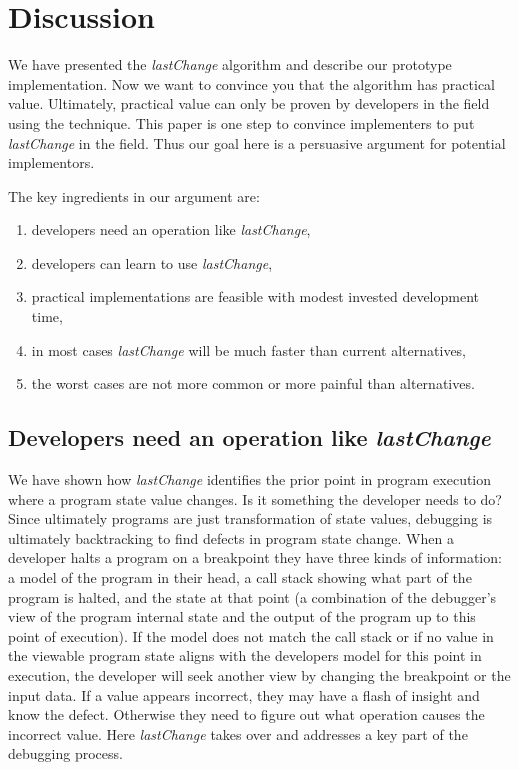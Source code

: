 \documentclass[preprint]{sigplanconf}
\begin{document}

\section{Discussion}

We have presented the \textit{lastChange} algorithm and describe our
prototype implementation. Now we want to convince you that the
algorithm has practical value. Ultimately, practical value can only be
proven by developers in the field using the technique. This paper is
one step to convince implementers to put \textit{lastChange} in the
field.  Thus our goal here is a persuasive argument for potential implementors.

The key ingredients in our argument are: 
\begin{enumerate}
   \item developers need an operation like \textit{lastChange}, 
   \item developers can learn to use \textit{lastChange}, 
   \item practical implementations are feasible with modest
invested development time,
   \item in most cases \textit{lastChange} will be much faster than current alternatives,
   \item the worst cases are not more common or more painful than
alternatives.
\end{enumerate}

\subsection{Developers need an operation like \protect\textit{lastChange} }

We have shown how \textit{lastChange} identifies the prior point in
program execution where a program state value changes. Is it something
the developer needs to do?  Since ultimately programs are just
transformation of state values, debugging is ultimately backtracking
to find defects in program state change.  When a developer halts a
program on a breakpoint they have three kinds of information: a model
of the program in their head, a call stack showing what part of the
program is halted, and the state at that point (a combination of the
debugger's view of the program internal state and the output of the
program up to this point of execution). If the model does not match
the call stack or if no value in the viewable program state aligns
with the developers model for this point in execution, the developer
will seek another view by changing the breakpoint or the input
data. If a value appears incorrect, they may have a flash of insight
and know the defect. Otherwise they need to figure out what operation
causes the incorrect value. Here \textit{lastChange} takes over and addresses a key
part of the debugging process.
\end{document}
